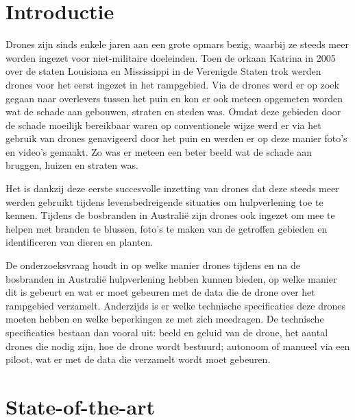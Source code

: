 
\section{Introductie} %
\label{sec:introductie}

Drones zijn sinds enkele jaren aan een grote opmars bezig, waarbij ze steeds meer worden ingezet voor niet-militaire doeleinden. Toen de orkaan Katrina in 2005 over de staten Louisiana en Mississippi in de Verenigde Staten trok werden drones voor het eerst ingezet in het rampgebied. \autocite{Murphy2015} Via de drones werd er op zoek gegaan naar overlevers tussen het puin en kon er ook meteen opgemeten worden wat de schade aan gebouwen, straten en steden was. Omdat deze gebieden door de schade moeilijk bereikbaar waren op conventionele wijze werd er via het gebruik van drones genavigeerd door het puin en werden er op deze manier foto's en video's gemaakt. Zo was er meteen een beter beeld wat de schade aan bruggen, huizen en straten was.


Het is dankzij deze eerste succesvolle inzetting van drones dat deze steeds meer werden gebruikt tijdens levensbedreigende situaties om hulpverlening toe te kennen. Tijdens de bosbranden in Australië zijn drones ook ingezet om mee te helpen met branden te blussen, foto's te maken van de getroffen gebieden en identificeren van dieren en planten.

De onderzoeksvraag houdt in op welke manier drones tijdens en na de bosbranden in Australië hulpverlening hebben kunnen bieden, op welke manier dit is gebeurt en wat er moet gebeuren met de data die de drone over het rampgebied verzamelt. Anderzijds is er welke technische specificaties deze drones moeten hebben en welke beperkingen ze met zich meedragen. De technische specificaties bestaan dan vooral uit: beeld en geluid van de drone, het aantal drones die nodig zijn, hoe de drone wordt bestuurd; autonoom of manueel via een piloot, wat er met de data die verzamelt wordt moet gebeuren.


\section{State-of-the-art}
\label{sec:state-of-the-art}

